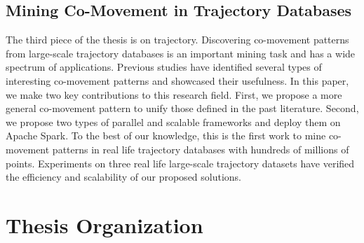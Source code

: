 \subsection{Mining Co-Movement in Trajectory Databases}
The third piece of the thesis is on trajectory.
Discovering co-movement patterns from large-scale trajectory 
databases is an important mining task and has a wide
spectrum of applications. Previous studies have identified
several types of interesting co-movement patterns and showcased 
their usefulness. In this paper, we make two key 
contributions to this research field. First, we propose a more
general co-movement pattern to unify those defined in the
past literature. Second, we propose two types of parallel and
scalable frameworks and deploy them on Apache Spark. To
the best of our knowledge, this is the first work to mine
co-movement patterns in real life trajectory databases with
hundreds of millions of points. Experiments on three real
life large-scale trajectory datasets have verified the efficiency
and scalability of our proposed solutions.

\section{Thesis Organization}
